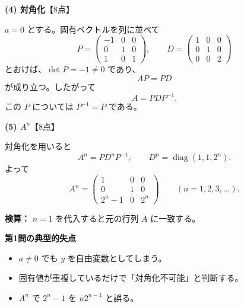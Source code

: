 \begin{solutionbox}
\textbf{(4) 対角化}\hfill【8点】

$a=0$ とする。固有ベクトルを列に並べて
\[
P=\begin{pmatrix}
-1&0&0\\
0&1&0\\
1&0&1
\end{pmatrix},
\qquad
D=\begin{pmatrix}
1&0&0\\
0&1&0\\
0&0&2
\end{pmatrix}
\]
とおけば、$\det P=-1\neq0$ であり、
\[
AP=PD
\]
が成り立つ。したがって
\[
\boxed{A=PDP^{-1}}.
\]
この $P$ については $P^{-1}=P$ である。
\end{solutionbox}

\begin{solutionbox}
\textbf{(5) $A^n$}\hfill【8点】

対角化を用いると
\[
A^n=PD^nP^{-1},\qquad
D^n=\operatorname{diag}(1,1,2^n).
\]
よって
\[
\boxed{
A^n=\begin{pmatrix}
1&0&0\\
0&1&0\\
2^n-1&0&2^n
\end{pmatrix}}
\qquad (n=1,2,3,\ldots).
\]

\textbf{検算：} $n=1$ を代入すると元の行列 $A$ に一致する。
\end{solutionbox}

\begin{pointbox}
\textbf{第1問の典型的失点}
\begin{itemize}[leftmargin=2em,itemsep=0.2em]
\item $a\neq0$ でも $y$ を自由変数としてしまう。
\item 固有値が重複しているだけで「対角化不可能」と判断する。
\item $A^n$ で $2^n-1$ を $n2^{n-1}$ と誤る。
\end{itemize}
\end{pointbox}
\newpage


